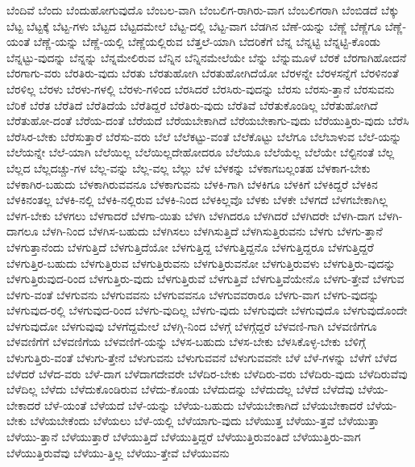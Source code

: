 {ಬೆಂದಿವೆ
ಬೆಂದು
ಬೆಂದುಹೋಗುವುದೊ
ಬೆಂಬಲ-ವಾಗಿ
ಬೆಂಬಲಿಗ-ರಾಗಿರು-ವಾಗ
ಬೆಂಬಲಿಗರಾಗಿ
ಬೆಂಬಿಡದೆ
ಬೆಕ್ಕು
ಬೆಟ್ಟ
ಬೆಟ್ಟಕ್ಕೆ
ಬೆಟ್ಟ-ಗಳು
ಬೆಟ್ಟದ
ಬೆಟ್ಟದಮೇಲೆ
ಬೆಟ್ಟ-ದಲ್ಲಿ
ಬೆಟ್ಟ-ವಾಗ
ಬೆಡಗಿನ
ಬೆಣೆ-ಯನ್ನು
ಬೆಣ್ಣೆ
ಬೆಣ್ಣೆಗೂ
ಬೆಣ್ಣೆ-ಯಂತೆ
ಬೆಣ್ಣೆ-ಯನ್ನು
ಬೆಣ್ಣೆ-ಯಲ್ಲಿ
ಬೆಣ್ಣೆಯಲ್ಲಿರುವ
ಬೆತ್ತಲೆ-ಯಾಗಿ
ಬೆದರಿಕೆಗೆ
ಬೆನ್ನ
ಬೆನ್ನಟ್ಟಿ
ಬೆನ್ನಟ್ಟಿ-ಕೊಂಡು
ಬೆನ್ನಟ್ಟು-ವುದನ್ನು
ಬೆನ್ನನ್ನು
ಬೆನ್ನಮೇಲಿರುವ
ಬೆನ್ನಿನ
ಬೆನ್ನಿನಮೇಲೆಯೇ
ಬೆನ್ನು
ಬೆನ್ನುಮೂಳೆ
ಬೆರಕೆ
ಬೆರಗಾಗಿಹೋದನೆ
ಬೆರಗಾಗು-ವರು
ಬೆರತಿರು-ವುದು
ಬೆರತು
ಬೆರತುಹೋಗಿ
ಬೆರತುಹೋಗಿದೆಯೋ
ಬೆರಳನ್ನೇ
ಬೆರಳಸನ್ನೆಗೆ
ಬೆರಳಿನಂತೆ
ಬೆರಳಿಲ್ಲ
ಬೆರಳು
ಬೆರಳು-ಗಳಲ್ಲಿ
ಬೆರಳು-ಗಳಿಂದ
ಬೆರಸಿದರೆ
ಬೆರಸಿರು-ವುದನ್ನು
ಬೆರಸು
ಬೆರಸು-ತ್ತಾನೆ
ಬೆರಸುವನು
ಬೆರಿಕೆ
ಬೆರೆತ
ಬೆರೆತಿದೆ
ಬೆರೆತಿದೆಯೆ
ಬೆರೆತಿದ್ದರೆ
ಬೆರೆತಿರು-ವುದು
ಬೆರೆತಿವೆ
ಬೆರೆತುಕೊಂಡಿಲ್ಲ
ಬೆರೆತುಹೋಗಿದೆ
ಬೆರೆತುಹೋ-ದಂತೆ
ಬೆರೆಯ-ದಂತೆ
ಬೆರೆಯದೆ
ಬೆರೆಯಬೇಕಾಗಿದೆ
ಬೆರೆಯಬೇಕಾಗು-ವುದು
ಬೆರೆಯುತ್ತಿರು-ವುದು
ಬೆರೆಸಿ
ಬೆರೆಸಿರ-ಬೇಕು
ಬೆರೆಸುತ್ತಾರೆ
ಬೆರೆಸು-ವರು
ಬೆಲೆ
ಬೆಲೆಕಟ್ಟು-ವಂತೆ
ಬೆಲೆಕೊಟ್ಟು
ಬೆಲೆಗೂ
ಬೆಲೆಬಾಳುವ
ಬೆಲೆ-ಯನ್ನು
ಬೆಲೆಯನ್ನೇ
ಬೆಲೆ-ಯಾಗಿ
ಬೆಲೆಯಿಲ್ಲ
ಬೆಲೆಯಿಲ್ಲದೇಹೋದರೂ
ಬೆಲೆಯೂ
ಬೆಲೆಯೆಲ್ಲ
ಬೆಲೆಯೇ
ಬೆಲ್ಟಿನಂತೆ
ಬೆಲ್ಲ
ಬೆಲ್ಲದ
ಬೆಲ್ಲದಚ್ಚು-ಗಳ
ಬೆಲ್ಲ-ವನ್ನು
ಬೆಲ್ಲ-ವಲ್ಲ
ಬೆಲ್ಲು
ಬೆಳ
ಬೆಳಕನ್ನು
ಬೆಳಕಾಗಬಲ್ಲಂತಹ
ಬೆಳಕಾಗ-ಬೇಕು
ಬೆಳಕಾಗಿರ-ಬಹುದು
ಬೆಳಕಾಗಿರುವವನೂ
ಬೆಳಕಾಗುವನು
ಬೆಳಕಿ-ಗಾಗಿ
ಬೆಳಕಿಗೂ
ಬೆಳಕಿಗೆ
ಬೆಳಕಿದ್ದರೆ
ಬೆಳಕಿನ
ಬೆಳಕಿನಂತಲ್ಲ
ಬೆಳಕಿ-ನಲ್ಲಿ
ಬೆಳಕಿ-ನಲ್ಲಿರುವ
ಬೆಳಕಿ-ನಿಂದ
ಬೆಳಕಿಲ್ಲವೊ
ಬೆಳಕು
ಬೆಳಕೇ
ಬೆಳಗದೆ
ಬೆಳಗಬೇಕಾಗಿಲ್ಲ
ಬೆಳಗ-ಬೇಕು
ಬೆಳಗಲು
ಬೆಳಗಾದರೆ
ಬೆಳಗಾ-ಯಿತು
ಬೆಳಗಿ
ಬೆಳಗಿದರೂ
ಬೆಳಗಿದರೆ
ಬೆಳಗಿದರೇ
ಬೆಳಗಿ-ದಾಗ
ಬೆಳಗಿ-ದಾಗಲೂ
ಬೆಳಗಿ-ನಿಂದ
ಬೆಳಗಿಸ-ಬಹುದು
ಬೆಳಗಿಸಲು
ಬೆಳಗಿಸುತ್ತಿದೆ
ಬೆಳಗಿಸುತ್ತಿರುವನು
ಬೆಳಗು
ಬೆಳಗು-ತ್ತಾನೆ
ಬೆಳಗುತ್ತಾನೆಂದು
ಬೆಳಗುತ್ತಿದೆ
ಬೆಳಗುತ್ತಿದೆಯೋ
ಬೆಳಗುತ್ತಿದ್ದ
ಬೆಳಗುತ್ತಿದ್ದನೊ
ಬೆಳಗುತ್ತಿದ್ದರೂ
ಬೆಳಗುತ್ತಿದ್ದರೆ
ಬೆಳಗುತ್ತಿರ-ಬಹುದು
ಬೆಳಗುತ್ತಿರುವ
ಬೆಳಗುತ್ತಿರುವನು
ಬೆಳಗುತ್ತಿರುವನೋ
ಬೆಳಗುತ್ತಿರುವಳು
ಬೆಳಗುತ್ತಿರು-ವುದನ್ನು
ಬೆಳಗುತ್ತಿರುವುದ-ರಿಂದ
ಬೆಳಗುತ್ತಿರು-ವುದು
ಬೆಳಗುತ್ತಿರುವೆ
ಬೆಳಗುತ್ತಿವೆ
ಬೆಳಗುತ್ತಿವೆಯೇನೊ
ಬೆಳಗು-ತ್ತೇವೆ
ಬೆಳಗುವ
ಬೆಳಗು-ವಂತೆ
ಬೆಳಗುವನು
ಬೆಳಗುವವನು
ಬೆಳಗುವವನೂ
ಬೆಳಗುವವರಾರೂ
ಬೆಳಗು-ವಾಗ
ಬೆಳಗು-ವುದನ್ನು
ಬೆಳಗುವುದ-ರಲ್ಲಿ
ಬೆಳಗುವುದ-ರಿಂದ
ಬೆಳಗು-ವುದಿಲ್ಲ
ಬೆಳಗು-ವುದು
ಬೆಳಗುವುದೇ
ಬೆಳಗುವುದೊ
ಬೆಳಗುವುದೊಂದೇ
ಬೆಳಗುವುದೋ
ಬೆಳಗುವುವು
ಬೆಳಗೆದ್ದಮೇಲೆ
ಬೆಳಗ್ಗಿ-ನಿಂದ
ಬೆಳಗ್ಗೆ
ಬೆಳಗ್ಗೆದ್ದರೆ
ಬೆಳವಣಿ-ಗಾಗಿ
ಬೆಳವಣಿಗೆಗೂ
ಬೆಳವಣಿಗೆಗೆ
ಬೆಳವಣಿಗೆಯ
ಬೆಳವಣಿಗೆ-ಯನ್ನು
ಬೆಳಸ-ಬಹುದು
ಬೆಳಸ-ಬೇಕು
ಬೆಳಸಿಕೊಳ್ಳ-ಬೇಕು
ಬೆಳಿಗ್ಗೆ
ಬೆಳುಗುತ್ತಿರು-ವಂತೆ
ಬೆಳುಗು-ತ್ತೇನೆ
ಬೆಳುಗುವನು
ಬೆಳುಗುವವನೆ
ಬೆಳುಗುವವನೇ
ಬೆಳೆ
ಬೆಳೆ-ಗಳನ್ನು
ಬೆಳೆಗೆ
ಬೆಳೆದ
ಬೆಳೆದರೆ
ಬೆಳೆದ-ವರು
ಬೆಳೆ-ದಾಗ
ಬೆಳೆದಾಗದೇವರೇ
ಬೆಳೆದಿರ-ಬೇಕು
ಬೆಳೆದಿರು-ವರು
ಬೆಳೆದಿರು-ವುದು
ಬೆಳೆದಿರುವೆವು
ಬೆಳೆದಿಲ್ಲ
ಬೆಳೆದು
ಬೆಳೆದುಕೊಂಡಿರುವ
ಬೆಳೆದು-ಕೊಂಡು
ಬೆಳೆದುದನ್ನು
ಬೆಳೆದುದೆಲ್ಲ
ಬೆಳೆದೆ
ಬೆಳೆದೆವು
ಬೆಳೆಯ-ಬೇಕಾದರೆ
ಬೆಳೆ-ಯಂತೆ
ಬೆಳೆಯದೆ
ಬೆಳೆ-ಯನ್ನು
ಬೆಳೆಯ-ಬಹುದು
ಬೆಳೆಯಬೇಕಾಗಿದೆ
ಬೆಳೆಯಬೇಕಾದರೆ
ಬೆಳೆಯ-ಬೇಕು
ಬೆಳೆಯಬೇಕೆಂದು
ಬೆಳೆಯಲು
ಬೆಳೆ-ಯಲ್ಲಿ
ಬೆಳೆಯಾಗು-ವುದು
ಬೆಳೆಯುತ್ತ
ಬೆಳೆಯು-ತ್ತವೆ
ಬೆಳೆಯುತ್ತಾ
ಬೆಳೆಯು-ತ್ತಾನೆ
ಬೆಳೆಯುತ್ತಾರೆ
ಬೆಳೆಯುತ್ತಿದೆ
ಬೆಳೆಯುತ್ತಿದ್ದರೆ
ಬೆಳೆಯುತ್ತಿರುವಂತಿದೆ
ಬೆಳೆಯುತ್ತಿರು-ವಾಗ
ಬೆಳೆಯುತ್ತಿರುವೆವು
ಬೆಳೆಯು-ತ್ತಿಲ್ಲ
ಬೆಳೆಯು-ತ್ತೇವೆ
ಬೆಳೆಯುವನು
}
